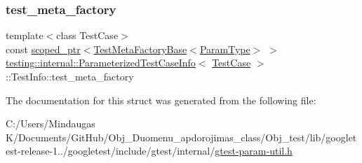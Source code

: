 \subsubsection{\texorpdfstring{test\_meta\_factory}{test\_meta\_factory}}
{\footnotesize\ttfamily template$<$class Test\+Case$>$ \\
const \mbox{\hyperlink{classtesting_1_1internal_1_1scoped__ptr}{scoped\+\_\+ptr}}$<$\mbox{\hyperlink{classtesting_1_1internal_1_1_test_meta_factory_base}{Test\+Meta\+Factory\+Base}}$<$\mbox{\hyperlink{classtesting_1_1internal_1_1_parameterized_test_case_info_a643a87e178bf92a4246ce21054e44b96}{Param\+Type}}$>$ $>$ \mbox{\hyperlink{classtesting_1_1internal_1_1_parameterized_test_case_info}{testing\+::internal\+::\+Parameterized\+Test\+Case\+Info}}$<$ \mbox{\hyperlink{classtesting_1_1_test_case}{Test\+Case}} $>$\+::Test\+Info\+::test\+\_\+meta\+\_\+factory}



The documentation for this struct was generated from the following file\+:\begin{DoxyCompactItemize}
\item 
C\+:/\+Users/\+Mindaugas K/\+Documents/\+Git\+Hub/\+Obj\+\_\+\+Duomenu\+\_\+apdorojimas\+\_\+class/\+Obj\+\_\+test/lib/googletest-\/release-\/1../googletest/include/gtest/internal/\mbox{\hyperlink{_obj__test_2lib_2googletest-release-1_88_81_2googletest_2include_2gtest_2internal_2gtest-param-util_8h}{gtest-\/param-\/util.\+h}}\end{DoxyCompactItemize}
